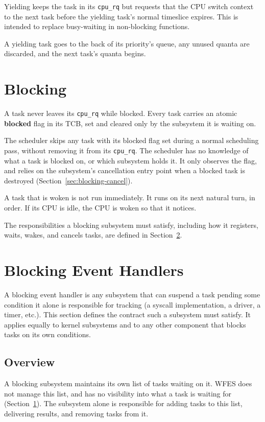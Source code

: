 \documentclass[11pt]{article}
\begin{document}
Yielding keeps the task in its \texttt{cpu\_rq} but requests that the CPU switch context to the next task before the yielding task's normal timeslice expires.
This is intended to replace busy-waiting in non-blocking functions.

A yielding task goes to the back of its priority's queue, any unused quanta are discarded, and the next task's quanta begins.

\section{Blocking}
\label{sec:blocking}

A task never leaves its \texttt{cpu\_rq} while blocked. Every task carries an atomic \textbf{blocked} flag in its TCB, set and cleared only by the subsystem it is waiting on.

The scheduler skips any task with its blocked flag set during a normal scheduling pass, without removing it from its \texttt{cpu\_rq}.
The scheduler has no knowledge of what a task is blocked on, or which subsystem holds it. It only observes the flag, and relies on the subsystem's cancellation entry point when a blocked task is destroyed (Section~\ref{sec:blocking-cancel}).

A task that is woken is not run immediately. It runs on its next natural turn, in order. If its CPU is idle, the CPU is woken so that it notices.

The responsibilities a blocking subsystem must satisfy, including how it registers, waits, wakes, and cancels tasks, are defined in Section~\ref{sec:blocking-handlers}.

\section{Blocking Event Handlers}
\label{sec:blocking-handlers}

A blocking event handler is any subsystem that can suspend a task pending some condition it alone is responsible for tracking (a syscall implementation, a driver, a timer, etc.).
This section defines the contract such a subsystem must satisfy.
It applies equally to kernel subsystems and to any other component that blocks tasks on its own conditions.

\subsection{Overview}

A blocking subsystem maintains its own list of tasks waiting on it.
WFES does not manage this list, and has no visibility into what a task is waiting for (Section~\ref{sec:blocking}).
The subsystem alone is responsible for adding tasks to this list, delivering results, and removing tasks from it.
\end{document}
